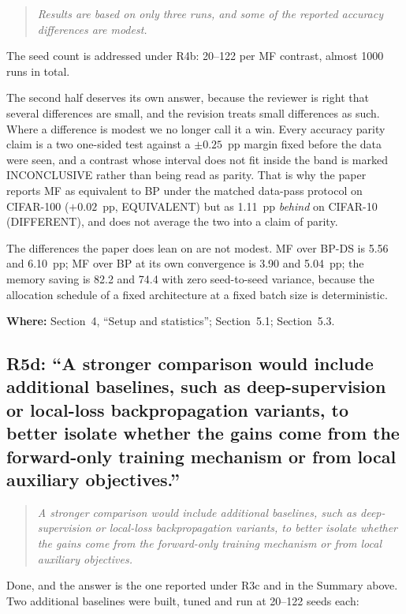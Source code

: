\documentclass[11pt,a4paper]{article}
\newcommand{\MF}{MF}
\newcommand{\BP}{BP}
\newcommand{\BPDS}{BP-DS}
\newenvironment{comment}%
  {\begin{quote}\itshape\small}%
  {\end{quote}}
\newcommand{\where}[1]{\par\smallskip\noindent\textbf{Where:} #1\par}
\begin{document}
\begin{comment}
Results are based on only three runs, and some of the reported accuracy
differences are modest.
\end{comment}

\noindent
The seed count is addressed under R4b: \numrange{20}{122} per \MF{} contrast,
almost \num{1000} runs in total.

The second half deserves its own answer, because the reviewer is right that
several differences are small, and the revision treats small differences as
such. Where a difference is modest we no longer call it a win. Every accuracy
parity claim is a two one-sided test against a $\pm\num{0.25}$~pp margin fixed
before the data were seen, and a contrast whose interval does not fit inside
the band is marked INCONCLUSIVE rather than being read as parity. That is why
the paper reports \MF{} as equivalent to \BP{} under the matched data-pass protocol on CIFAR-100
($+\num{0.02}$~pp, EQUIVALENT) but as \num{1.11}~pp \emph{behind} on CIFAR-10
(DIFFERENT), and does not average the two into a claim of parity.

The differences the paper does lean on are not modest. \MF{} over \BPDS{} is
\num{5.56} and \num{6.10}~pp; \MF{} over \BP{} at its own convergence is
\num{3.90} and \num{5.04}~pp; the memory saving is \num{82.2} and
\SI{74.4}{\mebibyte} with zero seed-to-seed variance, because the allocation
schedule of a fixed architecture at a fixed batch size is deterministic.

\where{Section~4, ``Setup and statistics''; Section~5.1; Section~5.3.}

\subsection*{R5d: ``A stronger comparison would include additional baselines,
such as deep-supervision or local-loss backpropagation variants, to better
isolate whether the gains come from the forward-only training mechanism or
from local auxiliary objectives.''}

\begin{comment}
A stronger comparison would include additional baselines, such as
deep-supervision or local-loss backpropagation variants, to better isolate
whether the gains come from the forward-only training mechanism or from local
auxiliary objectives.
\end{comment}

\noindent
Done, and the answer is the one reported under R3c and in the Summary above.
Two additional baselines were built, tuned and run at \numrange{20}{122} seeds
each:
\end{document}

